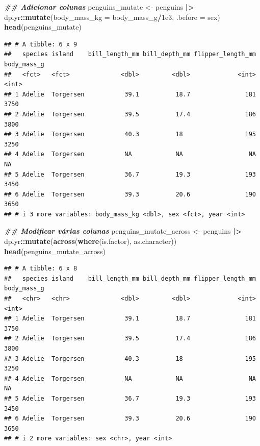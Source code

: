\documentclass[
]{article}
\newenvironment{Shaded}{\begin{snugshade}}{\end{snugshade}}
\newcommand{\AttributeTok}[1]{\textcolor[rgb]{0.13,0.29,0.53}{#1}}
\newcommand{\DocumentationTok}[1]{\textcolor[rgb]{0.56,0.35,0.01}{\textbf{\textit{#1}}}}
\newcommand{\FloatTok}[1]{\textcolor[rgb]{0.00,0.00,0.81}{#1}}
\newcommand{\FunctionTok}[1]{\textcolor[rgb]{0.13,0.29,0.53}{\textbf{#1}}}
\newcommand{\NormalTok}[1]{#1}
\newcommand{\OtherTok}[1]{\textcolor[rgb]{0.56,0.35,0.01}{#1}}
\newcommand{\SpecialCharTok}[1]{\textcolor[rgb]{0.81,0.36,0.00}{\textbf{#1}}}
\begin{document}
\begin{Shaded}
\begin{Highlighting}[]
\DocumentationTok{\#\# Adicionar colunas}
\NormalTok{penguins\_mutate }\OtherTok{\textless{}{-}}\NormalTok{ penguins }\SpecialCharTok{|\textgreater{}} 
\NormalTok{    dplyr}\SpecialCharTok{::}\FunctionTok{mutate}\NormalTok{(}\AttributeTok{body\_mass\_kg =}\NormalTok{ body\_mass\_g}\SpecialCharTok{/}\FloatTok{1e3}\NormalTok{, }\AttributeTok{.before =}\NormalTok{ sex)}
\FunctionTok{head}\NormalTok{(penguins\_mutate)}
\end{Highlighting}
\end{Shaded}

\begin{verbatim}
## # A tibble: 6 x 9
##   species island    bill_length_mm bill_depth_mm flipper_length_mm body_mass_g
##   <fct>   <fct>              <dbl>         <dbl>             <int>       <int>
## 1 Adelie  Torgersen           39.1          18.7               181        3750
## 2 Adelie  Torgersen           39.5          17.4               186        3800
## 3 Adelie  Torgersen           40.3          18                 195        3250
## 4 Adelie  Torgersen           NA            NA                  NA          NA
## 5 Adelie  Torgersen           36.7          19.3               193        3450
## 6 Adelie  Torgersen           39.3          20.6               190        3650
## # i 3 more variables: body_mass_kg <dbl>, sex <fct>, year <int>
\end{verbatim}

\begin{Shaded}
\begin{Highlighting}[]
\DocumentationTok{\#\# Modificar várias colunas}
\NormalTok{penguins\_mutate\_across }\OtherTok{\textless{}{-}}\NormalTok{ penguins }\SpecialCharTok{|\textgreater{}} 
\NormalTok{    dplyr}\SpecialCharTok{::}\FunctionTok{mutate}\NormalTok{(}\FunctionTok{across}\NormalTok{(}\FunctionTok{where}\NormalTok{(is.factor), as.character))}
\FunctionTok{head}\NormalTok{(penguins\_mutate\_across)}
\end{Highlighting}
\end{Shaded}

\begin{verbatim}
## # A tibble: 6 x 8
##   species island    bill_length_mm bill_depth_mm flipper_length_mm body_mass_g
##   <chr>   <chr>              <dbl>         <dbl>             <int>       <int>
## 1 Adelie  Torgersen           39.1          18.7               181        3750
## 2 Adelie  Torgersen           39.5          17.4               186        3800
## 3 Adelie  Torgersen           40.3          18                 195        3250
## 4 Adelie  Torgersen           NA            NA                  NA          NA
## 5 Adelie  Torgersen           36.7          19.3               193        3450
## 6 Adelie  Torgersen           39.3          20.6               190        3650
## # i 2 more variables: sex <chr>, year <int>
\end{verbatim}
\end{document}
